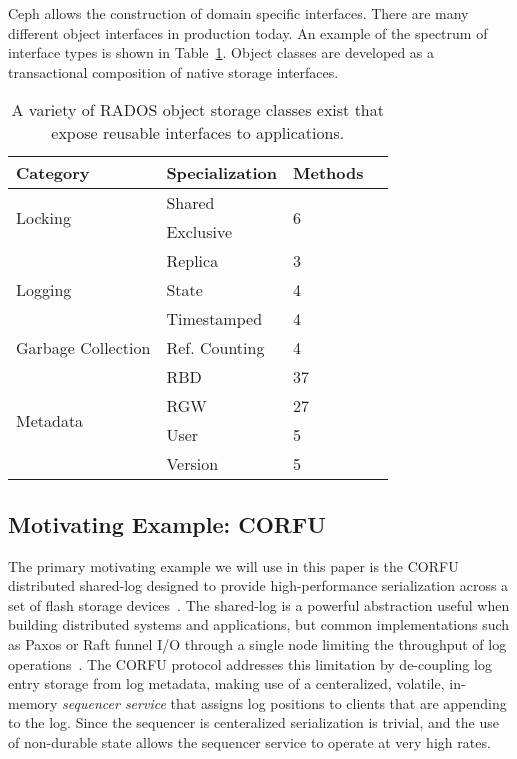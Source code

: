 \documentclass[10pt,twocolumn]{article}
\begin{document}
Ceph allows the construction of domain specific interfaces. There are many
different object interfaces in production today. An example of the spectrum of
interface types is shown in Table~\ref{tab:objclass-cats}. Object classes are
developed as a transactional composition of native storage interfaces.

\begin{table}
\centering
\begin{tabularx}{\columnwidth}{|X|l|l|l|}
\hline
Category & Specialization & Methods \\ \hline
\multirow{2}{*}{Locking} & Shared & \multirow{2}{*}{6} \\
                         & Exclusive & \\ \hline
\multirow{3}{*}{Logging} & Replica & 3 \\
                         & State & 4 \\
                         & Timestamped & 4 \\ \hline
Garbage Collection & Ref. Counting & 4 \\ \hline
\multirow{4}{*}{Metadata} & RBD & 37 \\
 & RGW & 27 \\
 & User & 5 \\
 & Version & 5 \\ \hline
\end{tabularx}
\caption{A variety of RADOS object storage classes exist that expose reusable
interfaces to applications.}
\label{tab:objclass-cats}
\end{table}

\subsection{Motivating Example: CORFU}

The primary motivating example we will use in this paper is the CORFU
distributed shared-log designed to provide high-performance serialization
across a set of flash storage devices~\cite{balakrishnan:nsdi12}. The
shared-log is a powerful abstraction useful when building distributed systems
and applications, but common implementations such as Paxos or Raft funnel I/O
through a single node limiting the throughput of log
operations~\cite{lamport:tocs89}. The CORFU protocol addresses this limitation
by de-coupling log entry storage from log metadata, making use of a
centeralized, volatile, in-memory \emph{sequencer service} that assigns log
positions to clients that are appending to the log. Since the sequencer is
centeralized serialization is trivial, and the use of non-durable state allows
the sequencer service to operate at very high rates.
\end{document}

